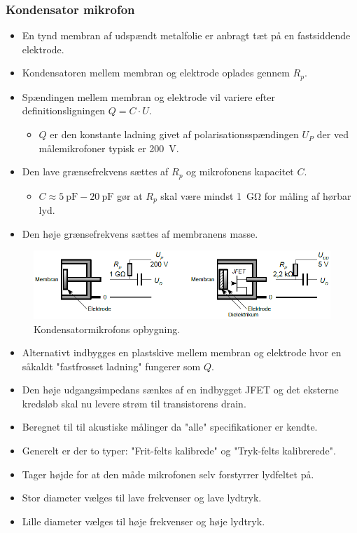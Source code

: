 \subsubsection{Kondensator mikrofon}
\begin{itemize}
	\item En tynd membran af udspændt metalfolie er anbragt tæt på
	en fastsiddende elektrode.
	\item Kondensatoren mellem membran og elektrode oplades gennem $R_p$. 
	\item Spændingen mellem membran og elektrode vil variere efter definitionsligningen $Q = C\cdot U$.
	\begin{itemize}
		\item $Q$ er den konstante ladning givet af polarisationsspændingen $U_P$ der ved målemikrofoner typisk er \SI{200}{\volt}.
	\end{itemize}
	\item Den lave grænsefrekvens sættes af $R_p$ og mikrofonens kapacitet $C$.
	\begin{itemize}
		\item $C \approx \SI{5}{\pico\farad}-\SI{20}{\pico\farad}$ gør at  $R_p$ skal være mindst \SI{1}{\giga\ohm} for måling af hørbar lyd.
	\end{itemize}
	\item Den høje grænsefrekvens sættes af membranens masse. 
\end{itemize}

\begin{figure} [H]
	\centering
	\includegraphics[width=\linewidth]{graphics/11.png}
	\caption{Kondensatormikrofons opbygning.}
	\label{fig:11}
\end{figure}

\begin{itemize}
	\item Alternativt indbygges en plastskive mellem membran og elektrode hvor en såkaldt "fastfrosset ladning" fungerer som $Q$.
	\item Den høje udgangsimpedans sænkes af en indbygget JFET og det eksterne kredsløb skal nu levere strøm til transistorens drain.
	\item Beregnet til til akustiske målinger da "alle" specifikationer er kendte.
	\item Generelt er der to typer: "Frit-felts kalibrede" og "Tryk-felts kalibrerede".
	\item Tager højde for at den måde mikrofonen selv forstyrrer lydfeltet på.
	\item Stor diameter vælges til lave frekvenser og lave lydtryk.
	\item Lille diameter vælges til høje frekvenser og høje lydtryk.
\end{itemize}

